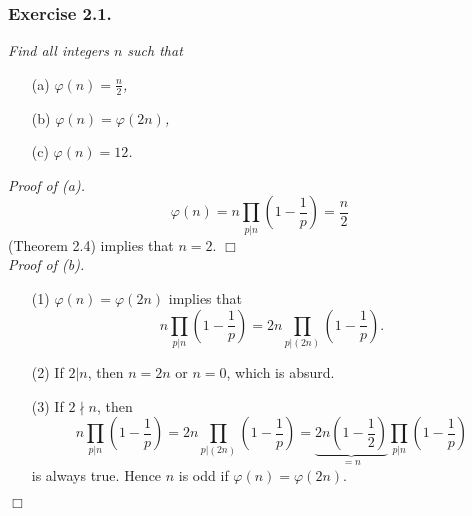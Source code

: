 \documentclass{article}
\begin{document}



\subsubsection*{Exercise 2.1.}
\emph{Find all integers $n$ such that}
\begin{enumerate}
\item[(a)]
  \emph{$\varphi(n) = \frac{n}{2}$,}

\item[(b)]
  \emph{$\varphi(n) = \varphi(2n)$,}

\item[(c)]
  \emph{$\varphi(n) = 12$.} \\
\end{enumerate}



\emph{Proof of (a).}
  \[
    \varphi(n) = n \prod_{p|n}\left( 1 - \frac{1}{p} \right) = \frac{n}{2}
  \]
  (Theorem 2.4) implies that $n = 2$.
$\Box$ \\



\emph{Proof of (b).}
\begin{enumerate}
\item[(1)]
  $\varphi(n) = \varphi(2n)$ implies that
  \[
    n \prod_{p|n}\left( 1 - \frac{1}{p} \right)
    = 2n \prod_{p|(2n)}\left( 1 - \frac{1}{p} \right).
  \]

\item[(2)]
  If $2 | n$, then $n = 2n$ or $n = 0$, which is absurd.

\item[(3)]
  If $2 \nmid n$, then
  \[
    n \prod_{p|n}\left( 1 - \frac{1}{p} \right)
    = 2n \prod_{p|(2n)}\left( 1 - \frac{1}{p} \right)
    = \underbrace{2n \left( 1 - \frac{1}{2} \right)}_{= n}
      \prod_{p|n}\left( 1 - \frac{1}{p} \right)
  \]
  is always true.
  Hence $n$ is odd if $\varphi(n) = \varphi(2n)$.
\end{enumerate}
$\Box$ \\
\end{document}
